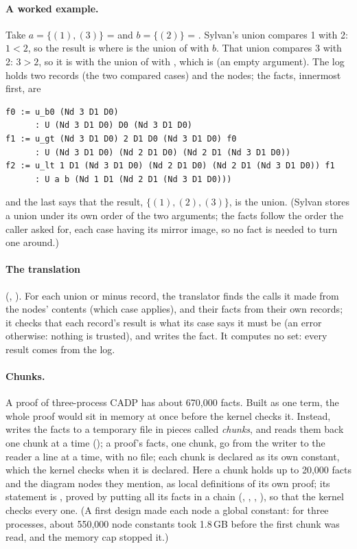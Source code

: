 \paragraph{A worked example.} Take $a = \{(1), (3)\}$ =
 and $b = \{(2)\}$ = . Sylvan's
union compares 1 with 2: $1 < 2$, so the result is  where
 is the union of  with $b$. That union compares 3
with 2: $3 > 2$, so it is  with  the union of
 with , which is  (an empty
argument). The log holds two records (the two compared cases) and the
nodes; the facts, innermost first, are
\begin{verbatim}
f0 := u_b0 (Nd 3 D1 D0)
      : U (Nd 3 D1 D0) D0 (Nd 3 D1 D0)
f1 := u_gt (Nd 3 D1 D0) 2 D1 D0 (Nd 3 D1 D0) f0
      : U (Nd 3 D1 D0) (Nd 2 D1 D0) (Nd 2 D1 (Nd 3 D1 D0))
f2 := u_lt 1 D1 (Nd 3 D1 D0) (Nd 2 D1 D0) (Nd 2 D1 (Nd 3 D1 D0)) f1
      : U a b (Nd 1 D1 (Nd 2 D1 (Nd 3 D1 D0)))
\end{verbatim}
and the last says that the result, $\{(1), (2), (3)\}$, is the union.
(Sylvan stores a union under its own order of the two arguments; the
facts follow the order the caller asked for, each case having its mirror
image, so no fact is needed to turn one around.)

\paragraph{The translation} (,
). For each union or minus record, the
translator finds the calls it made from the nodes' contents (which case
applies), and their facts from their own records; it checks that each
record's result is what its case says it must be (an error otherwise:
nothing is trusted), and writes the fact. It computes no set: every
result comes from the log.

\paragraph{Chunks.} A proof of three-process CADP has about 670,000
facts. Built as one term, the whole proof would sit in memory at once
before the kernel checks it. Instead,  writes
the facts to a temporary file in pieces called \emph{chunks}, and reads
them back one chunk at a time (); a proof's
facts, one chunk, go from the writer to the reader a line at a time,
with no file; each chunk is declared as its own
constant, which the kernel checks when it is declared. Here a chunk holds
up to 20,000 facts and the diagram nodes they mention, as local
definitions of its own proof; its statement is , proved by
putting all its facts in a chain (, ,
, ), so that the kernel checks
every one. (A first design made each node a global constant: for three
processes, about 550,000 node constants took 1.8\,GB before the first chunk
was read, and the memory cap stopped it.)

